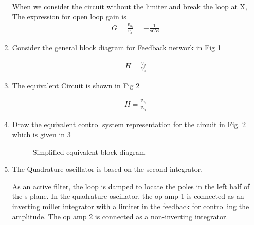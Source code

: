 \begin{enumerate}[label=\thesubsection.\arabic*.,ref=\thesubsection.\theenumi]
When we consider the circuit without the limiter and break the loop at X,
The expression for open loop gain is 
\begin{align}
    G = \frac{v_{o_1}}{v_x} = -\frac{1}{sCR}
    \label{eq:es17btech11009_G}
\end{align}

\item
Consider the general block diagram for Feedback network in Fig \ref{fig:es17btech11009_b3}
\renewcommand{\thefigure}{\theenumi.\arabic{figure}}
\begin{figure}[!ht]
	\begin{center}
		\resizebox{\columnwidth}{!}{}
	\end{center}
\caption{}
\label{fig:es17btech11009_b3}
\end{figure}
\begin{align}
    H = \frac{V_{f}}{V_{o}}
\end{align}
\item 
The equivalent Circuit is shown in Fig \ref{fig:es17btech11009_b4}
\renewcommand{\thefigure}{\theenumi.\arabic{figure}}
\begin{figure}[!ht]
	\begin{center}
		\resizebox{\columnwidth}{!}{}
	\end{center}
\caption{}
\label{fig:es17btech11009_b4}
\end{figure}
\begin{align}
    H = \frac{v_{o_2}}{v_{o_1}}
\end{align}
\item
Draw the equivalent control system representation for the circuit in Fig. \ref{fig:es17btech11009_b4} which is given in \ref{fig:es17btech11009_block}

\renewcommand{\thefigure}{\theenumi.\arabic{figure}}
\begin{figure}[!ht]
	\begin{center}
		\resizebox{\columnwidth}{!}{}
	\end{center}
\caption{Simplified equivalent block diagram}
\label{fig:es17btech11009_block}
\end{figure}
\item 
 The Quadrature oscillator is based on the second integrator.

As an active filter, the loop is damped to locate the poles in the left half of the s-plane. In the quadrature oscillator, the op amp 1 is connected as an inverting miller integrator with a limiter in the feedback for controlling the amplitude. The op amp 2 is connected as a non-inverting integrator.


\end{enumerate}
